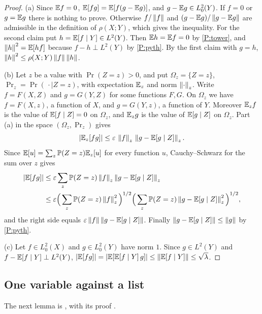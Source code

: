 \begin{proof}
(a) Since $\mathbb E f=0$, $\mathbb E[fg]=\mathbb E[f(g-\mathbb E g)]$, and $g-\mathbb E g\in L^2_0(Y)$. If $f=0$
or $g=\mathbb E g$ there is nothing to prove. Otherwise $f/\left\|f\right\|$ and
$(g-\mathbb E g)/\left\|g-\mathbb E g\right\|$ are admissible in the definition of $\rho(X;Y)$,
which gives the inequality. For the second claim put
$h=\mathbb E[f\mid Y]\in L^2(Y)$. Then $\mathbb E h=\mathbb E f=0$ by \ref{P:tower}, and
$\left\|h\right\|^2=\mathbb E[hf]$ because $f-h\perp L^2(Y)$ by \ref{P:pyth}. By the first
claim with $g=h$, $\left\|h\right\|^2\le\rho(X;Y)\left\|f\right\|\left\|h\right\|$.

(b) Let $z$ be a value with $\Pr(Z=z)>0$, and put $\Omega_z=\{Z=z\}$,
$\Pr_z=\Pr(\,\cdot\mid Z=z)$, with expectation $\mathbb E_z$ and norm
$\left\|\cdot\right\|_z$. Write $f=F(X,Z)$ and $g=G(Y,Z)$ for some functions $F,G$. On
$\Omega_z$ we have $f=F(X,z)$, a function of $X$, and $g=G(Y,z)$, a function
of $Y$. Moreover $\mathbb E_z f$ is the value of $\mathbb E[f\mid Z]=0$ on $\Omega_z$, and
$\mathbb E_z g$ is the value of $\mathbb E[g\mid Z]$ on $\Omega_z$. Part (a) in the space
$(\Omega_z,\Pr_z)$ gives
\[
  |\mathbb E_z[fg]|\le\varepsilon\,\left\|f\right\|_z\,\left\|g-\mathbb E[g\mid Z]\right\|_z .
\]
Since $\mathbb E[u]=\sum_z\mathbb P(Z=z)\mathbb E_z[u]$ for every function $u$, Cauchy--Schwarz
for the sum over $z$ gives
\begin{align*}
  |\mathbb E[fg]|&\le\varepsilon\sum_z\mathbb P(Z=z)\left\|f\right\|_z\left\|g-\mathbb E[g\mid Z]\right\|_z\\
  &\le\varepsilon\Big(\sum_z\mathbb P(Z=z)\left\|f\right\|_z^2\Big)^{1/2}
  \Big(\sum_z\mathbb P(Z=z)\left\|g-\mathbb E[g\mid Z]\right\|_z^2\Big)^{1/2},
\end{align*}
and the right side equals $\varepsilon\left\|f\right\|\left\|g-\mathbb E[g\mid Z]\right\|$. Finally
$\left\|g-\mathbb E[g\mid Z]\right\|\le\left\|g\right\|$ by \ref{P:pyth}.

(c) Let $f\in L^2_0(X)$ and $g\in L^2_0(Y)$ have norm $1$. Since
$g\in L^2(Y)$ and $f-\mathbb E[f\mid Y]\perp L^2(Y)$,
$|\mathbb E[fg]|=|\mathbb E[\mathbb E[f\mid Y]\,g]|\le\left\|\mathbb E[f\mid Y]\right\|\le\sqrt\lambda$.
\end{proof}

\subsection{One variable against a list}

The next lemma is \cite[Lemma~3.3.3]{Peyre}, with its proof
\cite[Claims~3.3.4 and 3.3.5]{Peyre}.

